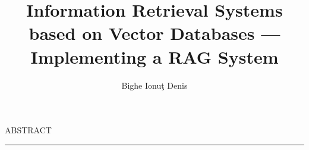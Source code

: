 \documentclass[12pt]{report}
\begin{document}
\title{Information Retrieval Systems based on Vector Databases --- Implementing a RAG System}
\author{Bighe Ionu\c{t} Denis}

\maketitle

\newpage
\thispagestyle{empty}
\mbox{}
\newpage
{}

\cleardoublepage
ABSTRACT
\vspace{0.5cm}
\hrule
\vspace{0.5cm}


\tableofcontents

\newpage
{}









\end{document}
